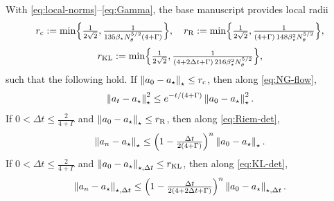 \begin{assumption}
\label{assump:local-input}
With \eqref{eq:local-norms}--\eqref{eq:Gamma}, the base manuscript provides local radii
\[
    r_{\mathrm c}
    :=
    \min\Bigl\{\tfrac1{2\sqrt2},\tfrac1{135\beta_\star N_\theta^{5/2}(4+\Gamma)}\Bigr\},
    \quad
    r_{\mathrm{R}}
    :=
    \min\Bigl\{\tfrac1{2\sqrt2},\tfrac1{(4+\Gamma)\,148\beta_\star^2N_\theta^{5/2}}\Bigr\},
\]
\[
    r_{\mathrm{KL}}
    :=
    \min\Bigl\{\tfrac1{2\sqrt2},\tfrac1{(4+2\Delta t+\Gamma)\,216\beta_\star^2N_\theta^{5/2}}\Bigr\},
\]
such that the following hold. If $\left\lVert a_0-a_\star\right\rVert_\star\leq r_{\mathrm c}$, then along
\eqref{eq:NG-flow},
\[
    \left\lVert a_t-a_\star\right\rVert_\star^2
    \leq
    e^{-t/(4+\Gamma)}\left\lVert a_0-a_\star\right\rVert_\star^2 .
\]
If $0<\Delta t\leq\tfrac2{4+\Gamma}$ and $\left\lVert a_0-a_\star\right\rVert_\star\leq r_{\mathrm{R}}$, then along
\eqref{eq:Riem-det},
\[
    \left\lVert a_n-a_\star\right\rVert_\star
    \leq
    \Bigl(1-\tfrac{\Delta t}{2(4+\Gamma)}\Bigr)^n\left\lVert a_0-a_\star\right\rVert_\star .
\]
If $0<\Delta t\leq\tfrac2{4+\Gamma}$ and $\left\lVert a_0-a_\star\right\rVert_{\star,\Delta t}\leq r_{\mathrm{KL}}$, then
along \eqref{eq:KL-det},
\[
    \left\lVert a_n-a_\star\right\rVert_{\star,\Delta t}
    \leq
    \Bigl(1-\tfrac{\Delta t}{2(4+2\Delta t+\Gamma)}\Bigr)^n\left\lVert a_0-a_\star\right\rVert_{\star,\Delta t} .
\]
\end{assumption}

